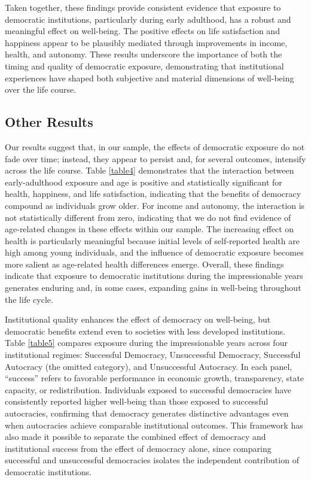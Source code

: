 \documentclass[11pt]{article}
\begin{document}
Taken together, these findings provide consistent evidence that exposure to democratic institutions, particularly during early adulthood, has a robust and meaningful effect on well-being. The positive effects on life satisfaction and happiness appear to be plausibly mediated through improvements in income, health, and autonomy. These results underscore the importance of both the timing and quality of democratic exposure, demonstrating that institutional experiences have shaped both subjective and material dimensions of well-being over the life course.



\vspace*{0.5cm}
\subsection{Other Results}\label{Main2}

Our results suggest that, in our sample, the effects of democratic exposure do not fade over time; instead, they appear to persist and, for several outcomes, intensify across the life course. Table \ref{table4} demonstrates that the interaction between early-adulthood exposure and age is positive and statistically significant for health, happiness, and life satisfaction, indicating that the benefits of democracy compound as individuals grow older. For income and autonomy, the interaction is not statistically different from zero, indicating that we do not find evidence of age-related changes in these effects within our sample. The increasing effect on health is particularly meaningful because initial levels of self-reported health are high among young individuals, and the influence of democratic exposure becomes more salient as age-related health differences emerge. Overall, these findings indicate that exposure to democratic institutions during the impressionable years generates enduring and, in some cases, expanding gains in well-being throughout the life cycle.

Institutional quality enhances the effect of democracy on well-being, but democratic benefits extend even to societies with less developed institutions. Table \ref{table5} compares exposure during the impressionable years across four institutional regimes: Successful Democracy, Unsuccessful Democracy, Successful Autocracy (the omitted category), and Unsuccessful Autocracy. In each panel, “success” refers to favorable performance in economic growth, transparency, state capacity, or redistribution. Individuals exposed to successful democracies have consistently reported higher well-being than those exposed to successful autocracies, confirming that democracy generates distinctive advantages even when autocracies achieve comparable institutional outcomes. This framework has also made it possible to separate the combined effect of democracy and institutional success from the effect of democracy alone, since comparing successful and unsuccessful democracies isolates the independent contribution of democratic institutions.
\end{document}
